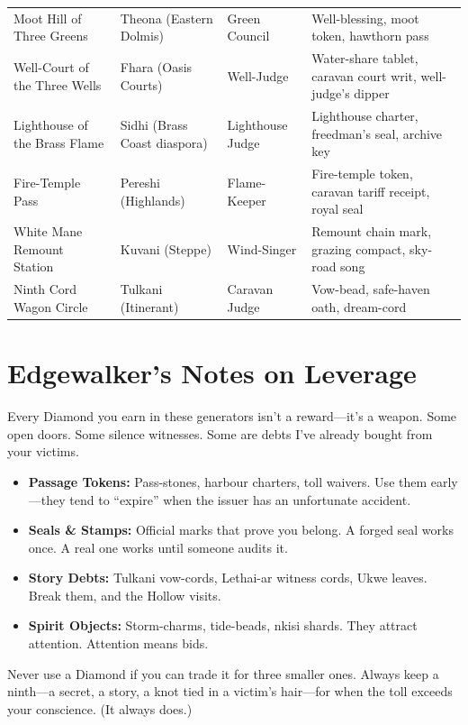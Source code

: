 \documentclass[11pt,letterpaper,twoside]{book}
\newcommand{\feTableEnd}{\rowcolors{2}{}{}}
\begin{document}
\begin{longtable}{llll}
Moot Hill of Three Greens & Theona (Eastern Dolmis) & Green Council & Well-blessing, moot token, hawthorn pass \\
Well-Court of the Three Wells & Fhara (Oasis Courts) & Well-Judge & Water-share tablet, caravan court writ, well-judge's dipper \\
Lighthouse of the Brass Flame & Sidhi (Brass Coast diaspora) & Lighthouse Judge & Lighthouse charter, freedman's seal, archive key \\
Fire-Temple Pass & Pereshi (Highlands) & Flame-Keeper & Fire-temple token, caravan tariff receipt, royal seal \\
White Mane Remount Station & Kuvani (Steppe) & Wind-Singer & Remount chain mark, grazing compact, sky-road song \\
Ninth Cord Wagon Circle & Tulkani (Itinerant) & Caravan Judge & Vow-bead, safe-haven oath, dream-cord \\
\end{longtable}
\feTableEnd

\newpage

\section{Edgewalker's Notes on Leverage}
\label{sec:edgewalker-leverage}

Every Diamond you earn in these generators isn't a reward---it's a weapon. Some open doors. Some silence witnesses. Some are debts I've already bought from your victims.

\begin{itemize}
\item \textbf{Passage Tokens:} Pass-stones, harbour charters, toll waivers. Use them early---they tend to ``expire'' when the issuer has an unfortunate accident.
\item \textbf{Seals \& Stamps:} Official marks that prove you belong. A forged seal works once. A real one works until someone audits it.
\item \textbf{Story Debts:} Tulkani vow-cords, Lethai-ar witness cords, Ukwe leaves. Break them, and the Hollow visits.
\item \textbf{Spirit Objects:} Storm-charms, tide-beads, nkisi shards. They attract attention. Attention means bids.
\end{itemize}

Never use a Diamond if you can trade it for three smaller ones. Always keep a ninth---a secret, a story, a knot tied in a victim's hair---for when the toll exceeds your conscience. (It always does.)
\end{document}
